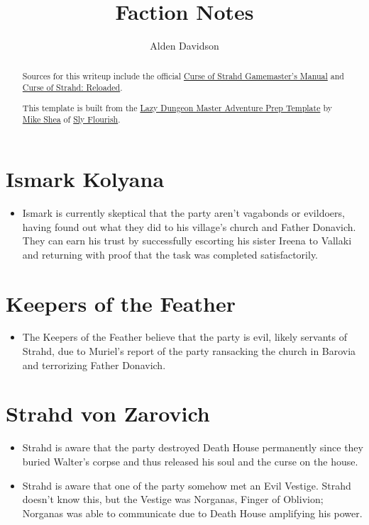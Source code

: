 \documentclass[a4paper,11pt]{article}
\title{Faction Notes}
\author{Alden Davidson}
\begin{document}
\maketitle
\tableofcontents

\begin{abstract}
  Sources for this writeup include the official
  \href{https://5e.tools/adventure.html#cos}{Curse of Strahd Gamemaster's Manual} and
  \href{https://www.reddit.com/r/CurseofStrahd/comments/9bpzbh/curse_of_strahd_reloaded_compilation_thread/}{Curse of Strahd: Reloaded}.
  
  This template is built from the
  \href{https://slyflourish.com/rotldm_template.html}{Lazy Dungeon Master Adventure Prep Template} by
  \href{https://slyflourish.com/about_mike_shea.html}{Mike Shea} of \href{https://slyflourish.com/}{Sly Flourish}.
\end{abstract}

\pagebreak
\section{Ismark Kolyana}
\begin{itemize}
  \item Ismark is currently skeptical that the party aren't vagabonds or evildoers, having found out what they did
  to his village's church and Father Donavich. They can earn his trust by successfully escorting his sister Ireena
  to Vallaki and returning with proof that the task was completed satisfactorily.
\end{itemize}

\section{Keepers of the Feather}
\begin{itemize}
  \item The Keepers of the Feather believe that the party is evil, likely servants of Strahd, due to Muriel's 
  report of the party ransacking the church in Barovia and terrorizing Father Donavich.
\end{itemize}

\section{Strahd von Zarovich}
\begin{itemize}
  \item Strahd is aware that the party destroyed Death House permanently since they buried Walter's corpse and 
  thus released his soul and the curse on the house.
  \item Strahd is aware that one of the party somehow met an Evil Vestige. Strahd doesn't know this, but the 
  Vestige was Norganas, Finger of Oblivion; Norganas was able to communicate due to Death House amplifying his 
  power.
\end{itemize}
\end{document}
